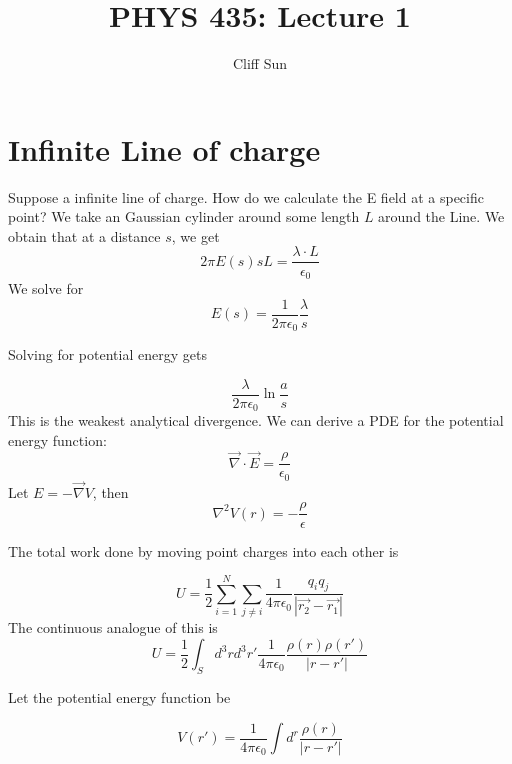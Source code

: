\documentclass{article}
\title{PHYS 435: Lecture 1}
\author{Cliff Sun}
\newtheorem{one minute paper}[theorem]{One Minute Paper}
\begin{document}
\maketitle

\section*{Infinite Line of charge}

Suppose a infinite line of charge. How do we calculate the E field at a specific point? We take an Gaussian cylinder around some length
$L$ around the Line. We obtain that at a distance $s$, we get
\begin{equation}
    2\pi E(s)sL = \frac{\lambda \cdot L}{\epsilon_0}
\end{equation}
We solve for
\begin{equation}
    E(s) = \frac{1}{2\pi\epsilon_0}\frac{\lambda}{s}
\end{equation}

Solving for potential energy gets 

\begin{equation}
    \frac{\lambda}{2\pi\epsilon_0}\ln\frac{a}{s}
\end{equation}
This is the weakest analytical divergence. We can derive a PDE for the potential energy function:
\begin{equation}
    \vec{\nabla} \cdot \vec{E} = \frac{\rho}{\epsilon_0}
\end{equation}
Let $E = -\vec{\nabla}V$, then 
\begin{equation}
    \nabla^{2}V(r) = -\frac{\rho}{\epsilon}
\end{equation}

The total work done by moving point charges into each other is 

\begin{equation}
    U = \frac{1}{2}\sum_{i=1}^{N}\sum_{j\neq i}\frac{1}{4\pi\epsilon_0}\frac{q_iq_j}{|\vec{r_2} - \vec{r_1}|}
\end{equation}
The continuous analogue of this is 
\begin{equation}
    U = \frac{1}{2}\int_{S}d^{3}rd^3r'\frac{1}{4\pi\epsilon_0}\frac{\rho(r)\rho(r')}{|r-r'|}
\end{equation}

Let the potential energy function be 

\begin{equation}
    V(r') =  \frac{1}{4\pi\epsilon_0}\int d^{r}\frac{\rho(r)}{|r - r'|}
\end{equation}
\end{document}
